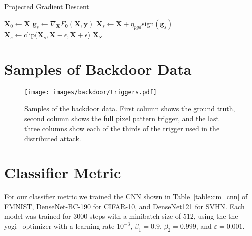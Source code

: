 \documentclass[conference,compsoc]{IEEEtran}
\begin{document}
\begin{algorithm}[H]
\caption{Projected Gradient Descent}
\label{alg:pgd}
\begin{algorithmic}[1]
        \State $\bm{X}_0 \gets \bm{X}$
            \State $\bm{g}_s \gets \nabla_{\bm{X}} F_{\bm{\theta}}(\bm{X}, \bm{y})$
            \State $\bm{X}_s \gets \bm{X} + \eta_{pgd} \text{sign}(\bm{g}_s)$
            \State $\bm{X}_s \gets \text{clip}(\bm{X}_s, \bm{X} - \epsilon, \bm{X} + \epsilon$)
        \EndFor
        \State \Return $\bm{X}_S$
    \EndFunction
\end{algorithmic}
\end{algorithm}


\section{Samples of Backdoor Data}\label{sec:triggers}

\begin{figure}[ht]
    \centering
    \texttt{[image: images/backdoor/triggers.pdf]}
    \caption{Samples of the backdoor data. First column shows the ground truth, second column shows the full pixel pattern trigger, and the last three columns show each of the thirds of the trigger used in the distributed attack.}
    \label{fig:triggers}
\end{figure}



\section{Classifier Metric}

For our classifier metric we trained the CNN shown in Table~\ref{table:cm_cnn} of FMNIST, DenseNet-BC-190 for CIFAR-10, and DenseNet121 for SVHN. Each model was trained for 3000 steps with a minibatch size of 512, using the the yogi~\cite{zaheer2018yogi} optimizer with a learning rate $10^{-3}$, $\beta_1 = 0.9$, $\beta_2 = 0.999$, and $\varepsilon = 0.001$.
\end{document}

